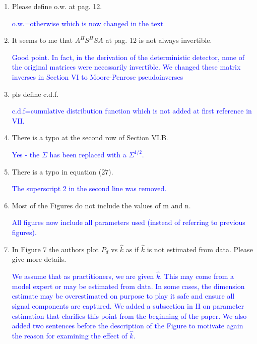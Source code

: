 \documentclass[11pt]{article}
\begin{document}
\begin{enumerate}
\item Please define o.w. at pag. 12.

  \textcolor{blue}{o.w.=otherwise which is now changed in the text}

\item It seems to me that $A^H S^H S A$ at pag. 12 is not always invertible.
  
  \textcolor{blue}{Good point. In fact, in the derivation of the deterministic detector, none of the original matrices were necessarily invertible. We changed these matrix inverses in Section VI to Moore-Penrose pseudoinverses}

\item pls define c.d.f.

  \textcolor{blue}{c.d.f=cumulative distribution function which is not added at first reference in VII.}

\item There is a typo at the second row of Section VI.B.

  \textcolor{blue}{Yes - the $\Sigma$ has been replaced with a $\Sigma^{1/2}$.}

\item There is a typo in equation (27).

  \textcolor{blue}{The superscript 2 in the second line was removed.}

\item Most of the Figures do not include the values of m and n.
 
 \textcolor{blue}{All figures now include all parameters used (instead of referring to previous figures). }

\item In Figure 7 the authors plot $P_d$ vs $\hat{k}$ as if $\hat{k}$ is not estimated from data. Please give more details.

  \textcolor{blue}{We assume that as practitioners, we are given $\widehat{k}$. This may come from a model expert or may be estimated from data. In some cases, the dimension estimate may be overestimated on purpose to play it safe and ensure all signal components are captured. We added a subsection in II on parameter estimation that clarifies this point from the beginning of the paper. We also added two sentences before the description of the Figure to motivate again the reason for examining the effect of $\widehat{k}$.}
\end{enumerate}
\end{document}
